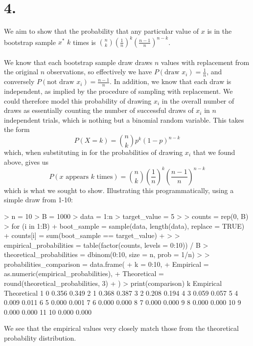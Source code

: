 \documentclass{article}
\begin{document}
{\Large 

\section*{4.}

We aim to show that the probability that any particular value of \(x\) is in the bootstrap sample \(x^*\) \(k\) times is \(\binom{n}{k}(\frac{1}{n})^k(\frac{n-1}{n})^{n-k}\). \\ \\
We know that each bootstrap sample draw draws \(n\) values with replacement from the original \(n\) observations, so effectively we have \(P(\text{draw } x_i) = \frac{1}{n}\), and conversely \(P(\text{not draw } x_i) = \frac{n-1}{n}\). In addition, we know that each draw is independent, as implied by the procedure of sampling with replacement. We could therefore model this probability of drawing \(x_i\) in the overall number of draws as essentially counting the number of successful draws of \(x_i\) in \(n\) independent trials, which is nothing but a binomial random variable. This takes the form
\[
  P(X = k) = \binom{n}{k}p^k(1-p)^{n-k}
\]
which, when substituting in for the probabilities of drawing \(x_i\) that we found above, gives us  
\[
  P(x \text{ appears } k \text{ times}) = \binom{n}{k}(\frac{1}{n})^k(\frac{n-1}{n})^{n-k}
\]
which is what we sought to show. Illustrating this programmatically, using a simple draw from 1-10:
\begin{spverbatim}
> n = 10
> B = 1000
> data = 1:n
> target_value = 5
> 
> counts = rep(0, B)
> for (i in 1:B) {
+   boot_sample = sample(data, length(data), replace = TRUE)
+   counts[i] = sum(boot_sample == target_value)
+ }
> 
> empirical_probabilities = table(factor(counts, levels = 0:10)) / B
> theoretical_probabilities = dbinom(0:10, size = n, prob = 1/n)
> 
> probabilities_comparison = data.frame(
+   k = 0:10,
+   Empirical = as.numeric(empirical_probabilities),
+   Theoretical = round(theoretical_probabilities, 3)
+ )
> print(comparison)
    k Empirical Theoretical
1   0     0.356       0.349
2   1     0.368       0.387
3   2     0.208       0.194
4   3     0.059       0.057
5   4     0.009       0.011
6   5     0.000       0.001
7   6     0.000       0.000
8   7     0.000       0.000
9   8     0.000       0.000
10  9     0.000       0.000
11 10     0.000       0.000
\end{spverbatim}
We see that the empirical values very closely match those from the theoretical probability distribution.

}
\end{document}
